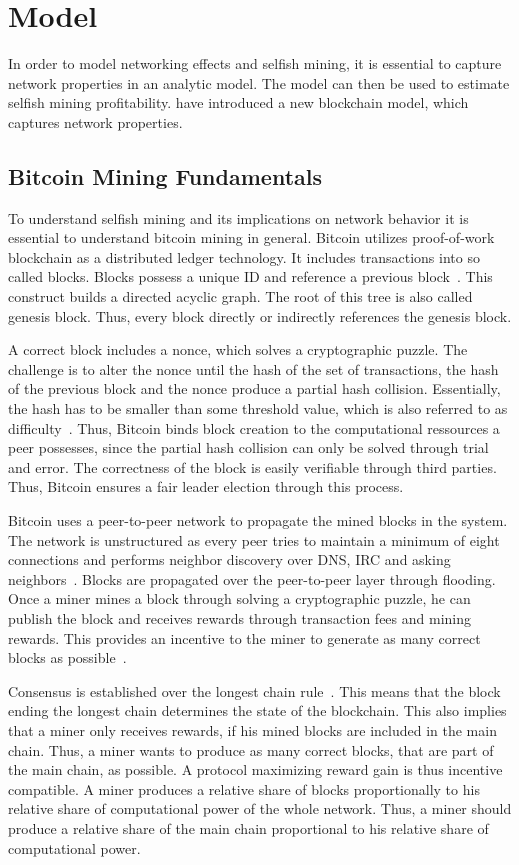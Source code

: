 \chapter{Model}\label{chap:model}
In order to model networking effects and selfish mining, it is essential to capture network properties in an analytic model. The model can then be used to estimate selfish mining profitability.
\citeauthor{gopalan} have introduced a new blockchain model, which captures network properties.
\section{Bitcoin Mining Fundamentals}
To understand selfish mining and its implications on network behavior it is essential to understand bitcoin mining in general.
Bitcoin utilizes proof-of-work blockchain as a distributed ledger technology.
It includes transactions into so called blocks. Blocks possess a unique ID and reference a previous block~\cite{tschorsch}. This construct builds a directed acyclic graph. The root of this tree is also called genesis block. Thus, every block directly or indirectly references the genesis block.

A correct block includes a nonce, which solves a cryptographic puzzle. The challenge is to alter the nonce until the hash of the set of transactions, the hash of the previous block and the nonce produce a partial hash collision. Essentially, the hash has to be smaller than some threshold value, which is also referred to as difficulty~\cite{tschorsch}.
Thus, Bitcoin binds block creation to the computational ressources a peer possesses, since the partial hash collision can only be solved through trial and error. The correctness of the block is easily verifiable through third parties. Thus, Bitcoin ensures a fair leader election through this process.

Bitcoin uses a peer-to-peer network to propagate the mined blocks in the system. The network is unstructured as every peer tries to maintain a minimum of eight connections and performs neighbor discovery over DNS, IRC and asking neighbors~\cite{tschorsch}. Blocks are propagated over the peer-to-peer layer through flooding.
Once a miner mines a block through solving a cryptographic puzzle, he can publish the block and receives rewards through transaction fees and mining rewards. This provides an incentive to the miner to generate as many correct blocks as possible~\cite{1}.

Consensus is established over the longest chain rule~\cite{1}. This means that the block ending the longest chain determines the state of the blockchain. This also implies that a miner only receives rewards, if his mined blocks are included in the main chain. Thus, a miner wants to produce as many correct blocks, that are part of the main chain, as possible. A protocol maximizing reward gain is thus incentive compatible.
A miner produces a relative share of blocks proportionally to his relative share of computational power of the whole network. Thus, a miner should produce a relative share of the main chain proportional to his relative share of computational power.

